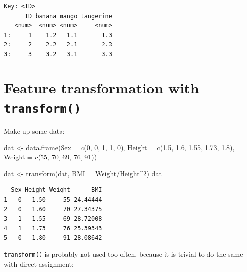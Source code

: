 \documentclass[
]{book}
\newenvironment{Shaded}{\begin{snugshade}}{\end{snugshade}}
\newcommand{\AttributeTok}[1]{\textcolor[rgb]{0.77,0.63,0.00}{#1}}
\newcommand{\DecValTok}[1]{\textcolor[rgb]{0.00,0.00,0.81}{#1}}
\newcommand{\FloatTok}[1]{\textcolor[rgb]{0.00,0.00,0.81}{#1}}
\newcommand{\FunctionTok}[1]{\textcolor[rgb]{0.00,0.00,0.00}{#1}}
\newcommand{\NormalTok}[1]{#1}
\newcommand{\OtherTok}[1]{\textcolor[rgb]{0.56,0.35,0.01}{#1}}
\newcommand{\SpecialCharTok}[1]{\textcolor[rgb]{0.00,0.00,0.00}{#1}}
\begin{document}
\begin{verbatim}
Key: <ID>
      ID banana mango tangerine
   <num>  <num> <num>     <num>
1:     1    1.2   1.1       1.3
2:     2    2.2   2.1       2.3
3:     3    3.2   3.1       3.3
\end{verbatim}

\hypertarget{feature-transformation-with-transform}{%
\section{\texorpdfstring{Feature transformation with \texttt{transform()}}{Feature transformation with transform()}}\label{feature-transformation-with-transform}}

Make up some data:

\begin{Shaded}
\begin{Highlighting}[]
\NormalTok{dat }\OtherTok{\textless{}{-}} \FunctionTok{data.frame}\NormalTok{(}\AttributeTok{Sex =} \FunctionTok{c}\NormalTok{(}\DecValTok{0}\NormalTok{, }\DecValTok{0}\NormalTok{, }\DecValTok{1}\NormalTok{, }\DecValTok{1}\NormalTok{, }\DecValTok{0}\NormalTok{),}
                  \AttributeTok{Height =} \FunctionTok{c}\NormalTok{(}\FloatTok{1.5}\NormalTok{, }\FloatTok{1.6}\NormalTok{, }\FloatTok{1.55}\NormalTok{, }\FloatTok{1.73}\NormalTok{, }\FloatTok{1.8}\NormalTok{),}
                  \AttributeTok{Weight =} \FunctionTok{c}\NormalTok{(}\DecValTok{55}\NormalTok{, }\DecValTok{70}\NormalTok{, }\DecValTok{69}\NormalTok{, }\DecValTok{76}\NormalTok{, }\DecValTok{91}\NormalTok{))}
\end{Highlighting}
\end{Shaded}

\begin{Shaded}
\begin{Highlighting}[]
\NormalTok{dat }\OtherTok{\textless{}{-}} \FunctionTok{transform}\NormalTok{(dat, }\AttributeTok{BMI =}\NormalTok{ Weight}\SpecialCharTok{/}\NormalTok{Height}\SpecialCharTok{\^{}}\DecValTok{2}\NormalTok{)}
\NormalTok{dat}
\end{Highlighting}
\end{Shaded}

\begin{verbatim}
  Sex Height Weight      BMI
1   0   1.50     55 24.44444
2   0   1.60     70 27.34375
3   1   1.55     69 28.72008
4   1   1.73     76 25.39343
5   0   1.80     91 28.08642
\end{verbatim}

\texttt{transform()} is probably not used too often, because it is trivial to do the same with direct assignment:
\end{document}
